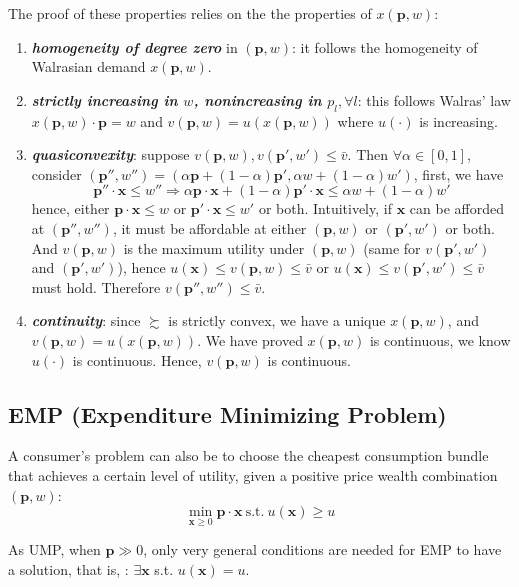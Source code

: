 The proof of these properties relies on the the properties of $ x(\mathbf{p},w)$:
\begin{enumerate}
    \item \textit{\textbf{homogeneity of degree zero}} in $(\mathbf{p},w)$: it follows the homogeneity of Walrasian demand $ x(\mathbf{p},w)$.
    \item \textit{\textbf{strictly increasing in $w$, nonincreasing in $p_l,\forall l$}}: this follows Walras' law $ x(\mathbf{p},w)\cdot \mathbf{p}=w$ and $v(\mathbf{p},w)=u( x(\mathbf{p},w))$ where $u(\cdot)$ is increasing.
    \item \textit{\textbf{quasiconvexity}}: suppose $v(\mathbf{p},w), v(\mathbf{p}',w')\leq \bar{v}$. Then $\forall \alpha\in[0,1]$, consider $(\mathbf{p}'',w'')=\left( \alpha\mathbf{p}+(1-\alpha)\mathbf{p}',\alpha w+(1-\alpha)w' \right)$, 
    first, we have $$ \mathbf{p}''\cdot\mathbf{x}\leq w''\Rightarrow \alpha \mathbf{p}\cdot\mathbf{x}+(1-\alpha)\mathbf{p}'\cdot \mathbf{x}\leq \alpha w+(1-\alpha)w'$$ hence, either $\mathbf{p}\cdot\mathbf{x}\leq w$ 
    or $\mathbf{p}'\cdot\mathbf{x}\leq w'$ or both. Intuitively, if $\mathbf{x}$ can be afforded at $(\mathbf{p}'',w'')$, it must be affordable at either $(\mathbf{p},w)$ or $(\mathbf{p}',w')$ or both. And $v(\mathbf{p},w)$ 
    is the maximum utility under $(\mathbf{p},w)$ (same for $v(\mathbf{p}',w')$ and $(\mathbf{p}',w')$), hence $u(\mathbf{x})\leq v(\mathbf{p},w)\leq \bar{v}$ or $u(\mathbf{x})\leq v(\mathbf{p}',w')\leq \bar{v}$ must hold. 
    Therefore $ v(\mathbf{p}'',w'')\leq \bar{v}$.
    \item \textit{\textbf{continuity}}: since $\succsim$ is strictly convex, we have a unique $ x(\mathbf{p},w)$, and $v(\mathbf{p},w)=u( x(\mathbf{p},w))$. We have proved $ x(\mathbf{p},w)$ is continuous, we know $u(\cdot)$ is continuous. Hence, $v(\mathbf{p},w)$ is continuous.
\end{enumerate}

\subsection{EMP (Expenditure Minimizing Problem)}
A consumer's problem can also be to choose the cheapest consumption bundle that achieves a certain level of utility, given a positive price wealth combination $(\mathbf{p},w)$:
$$\min_{\mathbf{x}\geq 0} \mathbf{p}\cdot\mathbf{x}\ \text{s.t.}\ u(\mathbf{x})\geq u$$

As UMP, when $\mathbf{p}\gg 0$, only very general conditions are needed for EMP to have a solution, that is, : $\exists \mathbf{x}$ s.t. $u(\mathbf{x})=u$.

